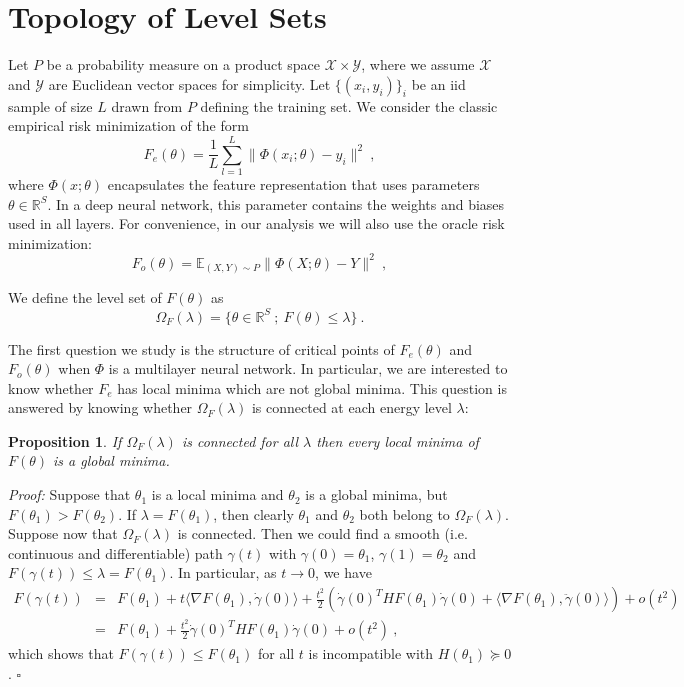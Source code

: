 \documentclass{article} %
\newcommand {\R} {{\mathbb{R}}}
\newcommand {\E} {{\mathbb{E}}}
\newcommand {\Fem} {F_{e}}
\newcommand {\Forr} {F_{o}}
\newtheorem{proposition}[theorem]{Proposition}
\begin{document}
\section{Topology of Level Sets}

Let $P$ be a probability measure on a product space $\mathcal{X} \times \mathcal{Y}$, 
where we assume $\mathcal{X}$ and $\mathcal{Y}$ are Euclidean vector spaces for simplicity.
Let $\{ (x_i, y_i)\}_i$ be an iid sample of size $L$ drawn from $P$ defining the training set.
We consider the classic empirical risk minimization of the form
\begin{equation}
\label{emp_risk_min}
\Fem(\theta) = \frac{1}{L} \sum_{l=1}^L \| \Phi(x_i;\theta) - y_i \|^2~,
\end{equation}
where $\Phi(x ; \theta)$ encapsulates the feature representation 
that uses parameters $\theta \in \R^S$. In a deep neural network, this parameter
contains the weights and biases used in all layers.
For convenience, in our analysis we will also use the oracle risk minimization:
\begin{equation}
\label{risk_min}
\Forr(\theta) = \E_{(X,Y) \sim P} \| \Phi(X;\theta) - Y \|^2~,
\end{equation}

We define the level set of $F(\theta)$ as 
\begin{equation}
\Omega_F(\lambda) = \{ \theta \in \R^S~;~F(\theta) \leq \lambda \}~. 
\end{equation}

The first question we study is the structure of critical points of $\Fem(\theta)$ and $\Forr(\theta)$
when $\Phi$ is a multilayer neural network. In particular, we are interested to know whether
$\Fem$ has local minima which are not global minima. This question is answered by 
knowing whether $\Omega_F(\lambda)$ is connected at each energy level $\lambda$:

\begin{proposition}
If $\Omega_F(\lambda)$ is connected for all $\lambda$ then every local minima of $F(\theta)$ is a global minima. 
\end{proposition}
{\it Proof:} Suppose that $\theta_1$ is a local minima and $\theta_2$ is a global minima, 
but $F(\theta_1) > F(\theta_2)$. If $\lambda = F(\theta_1)$, then clearly 
$\theta_1$ and $\theta_2$ both belong to $\Omega_F(\lambda)$. Suppose 
now that $\Omega_F(\lambda)$ 
is connected. Then we could find a smooth (i.e. continuous and differentiable) path $\gamma(t)$ 
with $\gamma(0) = \theta_1$, $\gamma(1)= \theta_2$ and $F(\gamma(t)) \leq \lambda = F(\theta_1)$.
In particular, as $t \to 0$, we have
\begin{eqnarray*}
F(\gamma(t)) &=& F(\theta_1) + t \langle \nabla F(\theta_1) , \dot{\gamma}(0) \rangle + \frac{t^2}{2} \left(\dot{\gamma}(0)^T H F(\theta_1) \dot{\gamma}(0) + \langle \nabla F(\theta_1), \ddot{\gamma}(0) \rangle \right) + o(t^2) \\
&=& F(\theta_1) +   \frac{t^2}{2}  \dot{\gamma}(0)^T H F(\theta_1) \dot{\gamma}(0)  + o(t^2) ~,
\end{eqnarray*}
which shows that $F(\gamma(t)) \leq F(\theta_1)$ for all $t$ is incompatible with $H(\theta_1) \succeq 0$. $\square$
\end{document}
